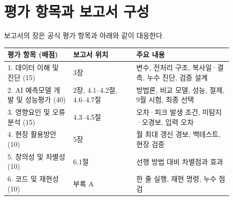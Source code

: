 \section*{평가 항목과 보고서 구성}
보고서의 장은 공식 평가 항목과 아래와 같이 대응한다.

\begin{center}
\small
\begin{tabular}{p{0.26\linewidth}p{0.25\linewidth}p{0.38\linewidth}}
\toprule
평가 항목 (배점) & 보고서 위치 & 주요 내용 \\
\midrule
1. 데이터 이해 및 진단 (15) & 3장 & 변수, 전처리 구조, 복사일·결측, 누수 진단, 검증 설계 \\
2. AI 예측모델 개발 및 성능평가 (40) & 2장, 4.1--4.2절, 4.6--4.7절 & 방법론, 비교 모델, 성능, 절제, 9월 시험, 최종 선택 \\
3. 영향요인 및 오류분석 (15) & 4.3--4.5절 & 오차·피크 발생 조건, 미탐지·오경보, 입력 오차 \\
4. 현장 활용방안 (10) & 5장 & 월 최대 갱신 경보, 백테스트, 현장 검증 \\
5. 창의성 및 차별성 (10) & 6.1절 & 선행 방법 대비 차별점과 효과 \\
6. 코드 및 재현성 (10) & 부록 A & 한 줄 실행, 재현 명령, 누수 점검 \\
\bottomrule
\end{tabular}
\end{center}
\clearpage
